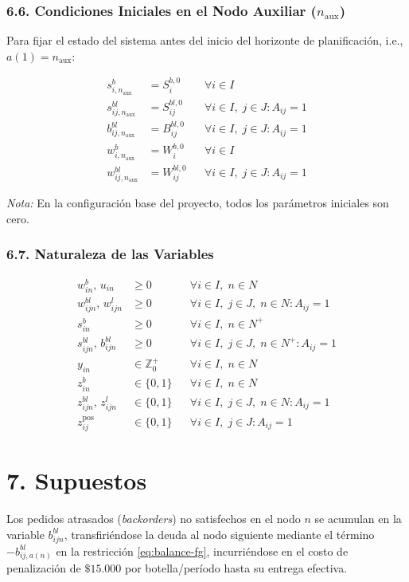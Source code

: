 \documentclass[11pt, letterpaper]{article}
\begin{document}
\subsubsection*{6.6. Condiciones Iniciales en el Nodo Auxiliar ($n_{\mathrm{aux}}$)}
Para fijar el estado del sistema antes del inicio del horizonte de planificación, i.e., $a(1) = n_{\mathrm{aux}}$:

\begin{align*}
    s^b_{i, n_{\mathrm{aux}}} &= S^{b,0}_i && \forall i \in I \\    
    s^{bl}_{ij, n_{\mathrm{aux}}} &= S^{bl,0}_{ij} && \forall i \in I,\; j \in J : A_{ij} = 1 \\
    b^{bl}_{ij, n_{\mathrm{aux}}} &= B^{bl,0}_{ij} && \forall i \in I,\; j \in J : A_{ij} = 1 \\
    w^b_{i, n_{\mathrm{aux}}} &= W^{b,0}_i && \forall i \in I \\
    w^{bl}_{ij, n_{\mathrm{aux}}} &= W^{bl,0}_{ij} && \forall i \in I,\; j \in J : A_{ij} = 1
\end{align*}

\textit{Nota:} En la configuración base del proyecto, todos los parámetros iniciales son cero.

\subsubsection*{6.7. Naturaleza de las Variables}

\begin{align*}
    w^b_{in}, \, u_{in} &\geq 0 && \forall i \in I,\; n \in N \\
    w^{bl}_{ijn}, \, w^l_{ijn} &\geq 0 && \forall i \in I,\; j \in J,\; n \in N : A_{ij} = 1 \\
    s^b_{in} &\geq 0 && \forall i \in I,\; n \in N^+ \\
    s^{bl}_{ijn}, \, b^{bl}_{ijn} &\geq 0 && \forall i \in I,\; j \in J,\; n \in N^+ : A_{ij} = 1 \\
    y_{in} &\in \mathbb{Z}^+_{0} && \forall i \in I,\; n \in N \\
    z^b_{in} &\in \{0, 1\} && \forall i \in I,\; n \in N \\
    z^{bl}_{ijn}, \, z^l_{ijn} &\in \{0, 1\} && \forall i \in I,\; j \in J,\; n \in N : A_{ij} = 1 \\
    z^{\mathrm{pos}}_{ij} &\in \{0, 1\} && \forall i \in I,\; j \in J : A_{ij} = 1
\end{align*}

\section*{7. Supuestos}

Los pedidos atrasados (\textit{backorders}) no satisfechos en el nodo $n$ se acumulan en la variable $b^{bl}_{ijn}$, transfiriéndose la deuda al nodo siguiente mediante el término $-b^{bl}_{ij,a(n)}$ en la restricción \eqref{eq:balance-fg}, incurriéndose en el costo de penalización de $\$15.000$ por botella/período hasta su entrega efectiva.
\end{document}

